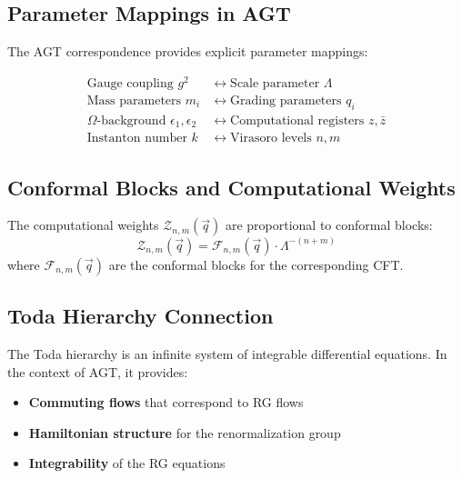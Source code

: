 \subsection{Parameter Mappings in AGT}

\begin{definition}
\label{def:agt-parameters}
The AGT correspondence provides explicit parameter mappings:

\begin{align}
\text{Gauge coupling } g^2 &\leftrightarrow \text{Scale parameter } \Lambda \\
\text{Mass parameters } m_i &\leftrightarrow \text{Grading parameters } q_i \\
\text{$\Omega$-background } \epsilon_1, \epsilon_2 &\leftrightarrow \text{Computational registers } z, \bar{z} \\
\text{Instanton number } k &\leftrightarrow \text{Virasoro levels } n, m
\end{align}
\end{definition}

\subsection{Conformal Blocks and Computational Weights}

\begin{theorem}
\label{thm:blocks-weights}
The computational weights $\mathcal{Z}_{n,m}(\vec{q})$ are proportional to conformal blocks:
\[
\mathcal{Z}_{n,m}(\vec{q}) = \mathcal{F}_{n,m}(\vec{q}) \cdot \Lambda^{-(n+m)}
\]
where $\mathcal{F}_{n,m}(\vec{q})$ are the conformal blocks for the corresponding CFT.
\end{theorem}

\subsection{Toda Hierarchy Connection}

\begin{definition}
\label{def:toda-hierarchy}
The Toda hierarchy is an infinite system of integrable differential equations. In the context of AGT, it provides:
\begin{itemize}
\item \textbf{Commuting flows} that correspond to RG flows
\item \textbf{Hamiltonian structure} for the renormalization group
\item \textbf{Integrability} of the RG equations
\end{itemize}
\end{definition}

